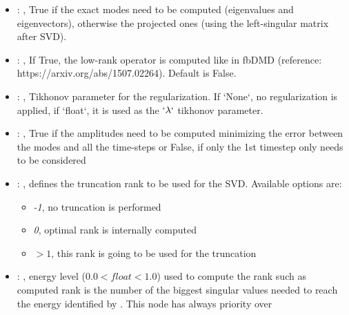 \begin{itemize}
    \item {}: , 
      True if the exact modes need to be computed (eigenvalues and
      eigenvectors),   otherwise the projected ones (using the left-singular matrix after SVD).

    \item {}: , 
      If True, the low-rank operator is computed like in fbDMD (reference:
      https://arxiv.org/abs/1507.02264).                                                  Default is
      False.

    \item {}: , 
      Tikhonov parameter for the regularization.                                                  If
      `None`, no regularization is applied, if `float`, it is used as the
      $`\lambda`$ tikhonov parameter.

    \item {}: , 
      True if the amplitudes need to be computed minimizing the error
      between the modes and all the time-steps or False, if only the 1st timestep only needs to be
      considered

    \item {}: , 
      defines the truncation rank to be used for the SVD.
      Available options are:                                                  \begin{itemize}
      \item \textit{-1}, no truncation is performed
      \item \textit{0}, optimal rank is internally computed
      \item \textit{$>1$}, this rank is going to be used for the truncation
      \end{itemize}

    \item {}: , 
      energy level ($0.0 < float < 1.0$) used to compute the rank such
      as computed rank is the number of the biggest singular values needed to reach the energy
      identified by                                                    . This
      node has always priority over  


\end{itemize}
